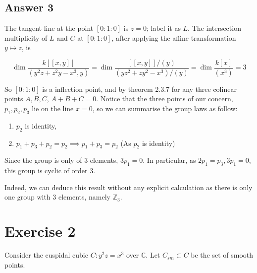 \documentclass{article}
\theoremstyle{definition}
\theoremstyle{definition}
\theoremstyle{remark}
\newcommand{\bb}[1]{\mathbb{#1}} %
\begin{document}
\subsection*{Answer 3}

The tangent line at the point $[0:1:0]$ is $z=0$; label it as $L$. 
The intersection multiplicity of $L$ and $C$ at $[0:1:0]$, after applying the affine transformation $y \mapsto z$, is

$$
\dim \frac{k[[x, y]]}{(y^2z + z^2y -x^3, y)} = \dim \frac{[[x,y]]/(y)}{(yz^2 + zy^2 - x^3)/(y)}= \dim \frac{k[x]}{(x^3)} = 3
$$

So $[0:1:0]$ is a inflection point, and by theorem 2.3.7 for any three colinear points $A, B, C$, $A + B+ C = 0$.
Notice that the three points of our concern, $p_1, p_2, p_3$ lie on the line $x = 0$, so we can summarise the group laws as follow: 

\begin{enumerate}
	\item $p_2$ is identity,
	\item $p_1 + p_3 + p_2 = p_2 \implies p_1 + p_3 = p_2$ (As $p_2$ is identity)
\end{enumerate}

Since the group is only of $3$ elements, $3p_1 = 0$.
In particular, as $2p_1 = p_3, 3p_1 = 0$, this group is cyclic of order 3.

Indeed, we can deduce this result without any explicit calculation as there is only one group with $3$ elements, namely $\bb{Z}_3$.

\newpage

\section*{Exercise 2}
Consider the cuspidal cubic $C: y^2z = x^3$ over $\mathbb{C}$. Let $C_{sm} \subset C$ be the set of smooth points.
\end{document}
